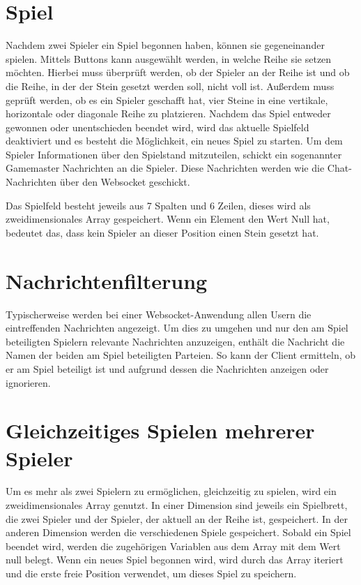 \section{Spiel}\label{sec:Spiel}
Nachdem zwei Spieler ein Spiel begonnen haben, können sie gegeneinander spielen. Mittels Buttons kann ausgewählt werden, in welche Reihe sie setzen möchten. Hierbei muss überprüft werden, ob der Spieler an der Reihe ist und ob die Reihe, in der der Stein gesetzt werden soll, nicht voll ist. Außerdem muss geprüft werden, ob es ein Spieler geschafft hat, vier Steine in eine vertikale, horizontale oder diagonale Reihe zu platzieren. Nachdem das Spiel entweder gewonnen oder unentschieden beendet wird, wird das aktuelle Spielfeld deaktiviert und es besteht die Möglichkeit, ein neues Spiel zu starten. Um dem Spieler Informationen über den Spielstand mitzuteilen, schickt ein sogenannter Gamemaster Nachrichten an die Spieler.  Diese Nachrichten werden wie die Chat-Nachrichten über den Websocket geschickt.

Das Spielfeld besteht jeweils aus 7 Spalten und 6 Zeilen, dieses wird als zweidimensionales Array gespeichert. Wenn ein Element den Wert Null hat, bedeutet das, dass kein Spieler an dieser Position einen Stein gesetzt hat.

\section{Nachrichtenfilterung}\label{sec:Nachrichtenfilter}
Typischerweise werden bei einer Websocket-Anwendung allen Usern die eintreffenden Nachrichten angezeigt. Um dies zu umgehen und nur den am Spiel beteiligten Spielern relevante Nachrichten anzuzeigen, enthält die Nachricht die Namen der beiden am Spiel beteiligten Parteien. So kann der Client ermitteln, ob er am Spiel beteiligt ist und aufgrund dessen die Nachrichten anzeigen oder ignorieren. 

\section{Gleichzeitiges Spielen mehrerer Spieler}\label{sec:Multiplegames}
Um es mehr als zwei Spielern zu ermöglichen, gleichzeitig zu spielen, wird ein zweidimensionales Array genutzt. In einer Dimension sind jeweils ein Spielbrett, die zwei Spieler und der Spieler, der aktuell an der Reihe ist, gespeichert. In der anderen Dimension werden die verschiedenen Spiele gespeichert. Sobald ein Spiel beendet wird, werden die zugehörigen Variablen aus dem Array mit dem Wert null belegt. Wenn ein neues Spiel begonnen wird, wird durch das Array iteriert und die erste freie Position verwendet, um dieses Spiel zu speichern. 
